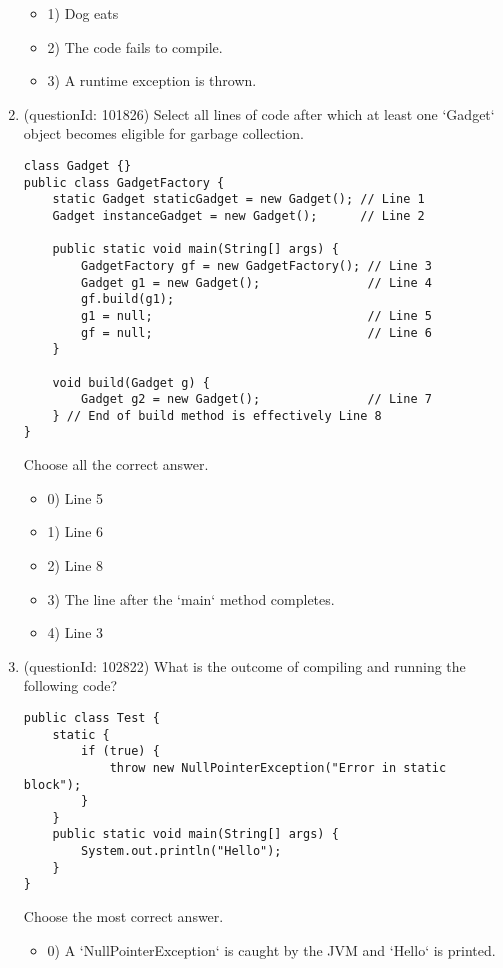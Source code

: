 \documentclass[12pt]{article}
\begin{document}
\begin{enumerate}[label=(\arabic*)]
\begin{itemize}
\item 1) Dog eats

\item 2) The code fails to compile.

\item 3) A runtime exception is thrown.

\end{itemize}
\item (questionId: 101826) Select all lines of code after which at least one `Gadget` object becomes eligible for garbage collection.
\begin{verbatim}
class Gadget {}
public class GadgetFactory {
    static Gadget staticGadget = new Gadget(); // Line 1
    Gadget instanceGadget = new Gadget();      // Line 2

    public static void main(String[] args) {
        GadgetFactory gf = new GadgetFactory(); // Line 3
        Gadget g1 = new Gadget();               // Line 4
        gf.build(g1);
        g1 = null;                              // Line 5
        gf = null;                              // Line 6
    }

    void build(Gadget g) {
        Gadget g2 = new Gadget();               // Line 7
    } // End of build method is effectively Line 8
}
\end{verbatim}
Choose all the correct answer.\begin{itemize}
\item 0) Line 5

\item 1) Line 6

\item 2) Line 8

\item 3) The line after the `main` method completes.

\item 4) Line 3

\end{itemize}
\item (questionId: 102822) What is the outcome of compiling and running the following code?
\begin{verbatim}
public class Test {
    static {
        if (true) {
            throw new NullPointerException("Error in static block");
        }
    }
    public static void main(String[] args) {
        System.out.println("Hello");
    }
}
\end{verbatim}
Choose the most correct answer. 
\begin{itemize}
\item 0) A `NullPointerException` is caught by the JVM and `Hello` is printed.


\end{itemize}
\end{enumerate}
\end{document}
